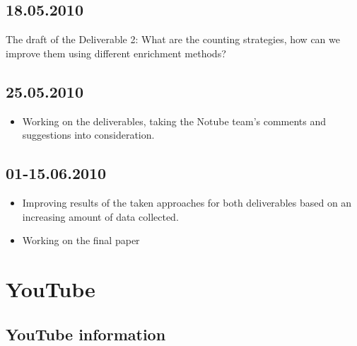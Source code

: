 \documentclass{article}
\begin{document}
\subsection{18.05.2010}
The draft of the Deliverable 2:
What are the counting strategies, how can we improve them using different
enrichment methods?


\subsection{25.05.2010}
\begin{itemize}
\item{Working on the deliverables, taking the Notube team's comments and suggestions
into consideration.}
\end{itemize}


\subsection{01-15.06.2010}
\begin{itemize}
\item{Improving results of the taken approaches for both deliverables based on an
increasing amount of data collected.}
\item{Working on the final paper}
\end{itemize}

\newpage
\section{YouTube}

\subsection{YouTube information}
\end{document}
